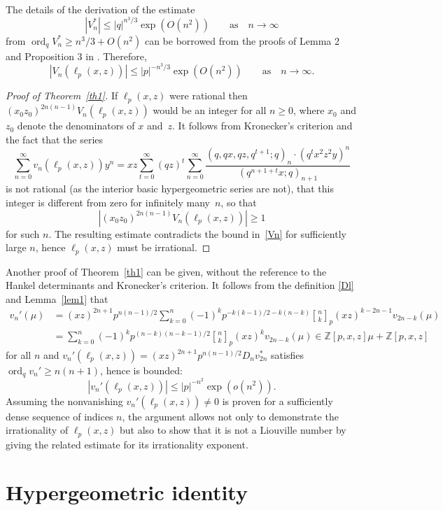 \documentclass[12pt,reqno]{amsart}
\theoremstyle{remark}
\newcommand{\ord}{\operatorname{ord}}
\newcommand{\pbinom}[2]{{\genfrac{[}{]}{0pt}{}{#1}{#2}}_p}
\begin{document}
The details of the derivation of the estimate
$$
|V_n^*|\le|q|^{n^3/3}\exp(O(n^2)) \qquad\text{as}\quad n\to\infty
$$
from $\ord_qV_n^*\ge n^3/3+O(n^2)$ can be borrowed from the proofs of Lemma 2 and Proposition 3 in \cite{KRVZ09}.
Therefore,
\begin{equation}
|V_n(\ell_p(x,z))|\le|p|^{-n^3/3}\exp(O(n^2)) \qquad\text{as}\quad n\to\infty.
\label{Vn}
\end{equation}

\begin{proof}[Proof of Theorem~\textup{\ref{th1}}]
If $\ell_p(x,z)$ were rational then $(x_0z_0)^{2n(n-1)}V_n(\ell_p(x,z))$ would be an integer for all $n\ge0$, where $x_0$ and $z_0$
denote the denominators of $x$ and~$z$. It follows from Kronecker's criterion \cite[Division~7, Problem~24]{PS76} and the fact that
the series
$$
\sum_{n=0}^\infty v_n(\ell_p(x,z))y^n
=xz\sum_{t=0}^\infty(qz)^t\sum_{n=0}^\infty\frac{(q,qx,qz,q^{t+1};q)_n\cdot(q^tx^2z^2y)^n}{(q^{n+1+t}x;q)_{n+1}}
$$
is not rational (as the interior basic hypergeometric series are not), that this integer is different from zero for infinitely many~$n$, so that
$$
|(x_0z_0)^{2n(n-1)}V_n(\ell_p(x,z))|\ge1
$$
for such $n$. The resulting estimate contradicts the bound in~\eqref{Vn} for sufficiently large $n$, hence $\ell_p(x,z)$ must be irrational.
\end{proof}

Another proof of Theorem~\ref{th1} can be given, without the reference to the Hankel determinants and Kronecker's criterion.
It follows from the definition \eqref{Dl} and Lemma~\ref{lem1} that
\begin{align*}
v_n'(\mu)
&=(xz)^{2n+1}p^{n(n-1)/2}\sum_{k=0}^n(-1)^kp^{-k(k-1)/2-k(n-k)}\pbinom nk(xz)^{k-2n-1}v_{2n-k}(\mu)
\\
&=\sum_{k=0}^n(-1)^kp^{(n-k)(n-k-1)/2}\pbinom nk(xz)^kv_{2n-k}(\mu)\in\mathbb Z[p,x,z]\mu+\mathbb Z[p,x,z]
\end{align*}
for all $n$ and $v_n'(\ell_p(x,z))=(xz)^{2n+1}p^{n(n-1)/2}D_nv_{2n}^*$ satisfies $\ord_qv_n'\ge n(n+1)$, hence is bounded:
$$
|v_n'(\ell_p(x,z))|\le|p|^{-n^2}\exp(o(n^2)).
$$
Assuming the nonvanishing $v_n'(\ell_p(x,z))\ne0$ is proven for a sufficiently dense
sequence of indices $n$, the argument allows not only to demonstrate the irrationality of $\ell_p(x,z)$ but also
to show that it is not a Liouville number by giving the related estimate for its irrationality exponent.

\section{Hypergeometric identity}
\label{shyp}
\end{document}
